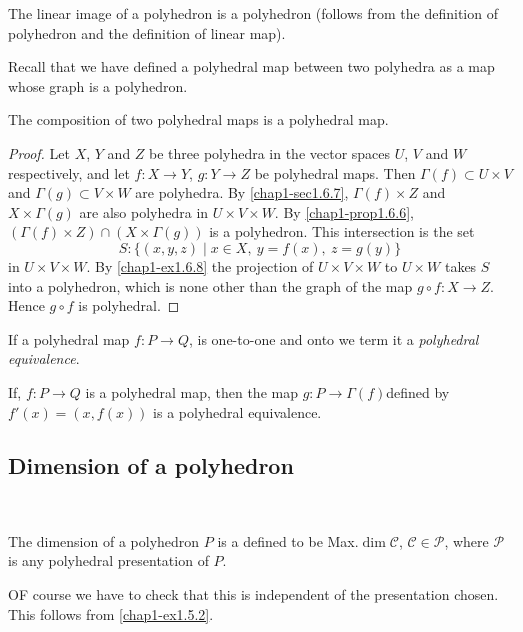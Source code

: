 \setcounter{proposition}{7}
\begin{ex}\label{chap1-ex1.6.8}
The linear image of a polyhedron is a polyhedron (follows from the definition of polyhedron and the definition of linear map).
\end{ex}

Recall that we have defined a polyhedral map between two polyhedra as a map whose graph is a polyhedron.

\begin{proposition}\label{chap1-prop1.6.9}
The composition of two polyhedral maps is a polyhedral map.
\end{proposition}

\begin{proof}
Let $X$, $Y$ and $Z$ be three polyhedra in the vector spaces $U$, $V$ and $W$ respectively, and let $f:X\to Y$, $g:Y\to Z$ be polyhedral maps. Then $\Gamma(f)\subset U\times V$ and $\Gamma(g)\subset V\times W$ are polyhedra. By \ref{chap1-sec1.6.7}, $\Gamma(f)\times Z$ and $X\times \Gamma(g)$ are also polyhedra in $U\times V\times W$. By \ref{chap1-prop1.6.6}, $(\Gamma(f)\times Z)\cap (X\times \Gamma(g))$ is a polyhedron. This intersection is the set
$$
S:\{(x,y,z)\mid x\in X,\ y=f(x),\ z=g(y)\}
$$
in $U\times V\times W$. By \ref{chap1-ex1.6.8} the projection of $U\times V\times W$ to $U\times W$ takes $S$ into a polyhedron, which is none other than the graph of the map $g\circ f:X\to Z$. Hence $g\circ f$ is polyhedral.
\end{proof}

If a polyhedral map $f:P\to Q$, is one-to-one and onto we term it a {\em polyhedral equivalence}.

\begin{ex}\label{chap1-ex1.6.10}
If, $f:P\to Q$ is a polyhedral map, then the map $g:P\to \Gamma(f)$\pageoriginale defined by $f'(x)=(x,f(x))$ is a polyhedral equivalence. 
\end{ex}

\setcounter{subsection}{10}
\subsection{Dimension of a polyhedron}\label{chap1-sec1.6.11}

~\phantom{a}

The dimension of a polyhedron $P$ is a defined to be Max.\@ $\dim \mathcal{C}$, $\mathcal{C}\in \mathscr{P}$, where $\mathscr{P}$ is any polyhedral presentation of $P$. 

OF course we have to check that this is independent of the presentation chosen. This follows from \ref{chap1-ex1.5.2}.

